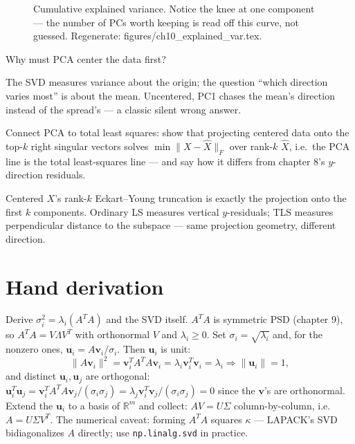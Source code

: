 \begin{figure}[htbp]
\centering

\caption{Cumulative explained variance. Notice the knee at one component
--- the number of PCs worth keeping is read off this curve, not guessed.
Regenerate: \ttfamily figures/ch10\_explained\_var.tex.}
\label{fig:explvar}
\end{figure}

\begin{exercise}[easy]
Why must PCA center the data first?
\begin{solution}
The SVD measures variance about the origin; the question ``which
direction varies most'' is about the mean. Uncentered, PC1 chases the
mean's direction instead of the spread's --- a classic silent wrong
answer.
\end{solution}
\end{exercise}

\begin{exercise}[hard]
Connect PCA to total least squares: show that projecting centered data
onto the top-$k$ right singular vectors solves $\min\lVert X-\hat
X\rVert_{F}$ over rank-$k$ $\hat X$, i.e.\ the PCA line is the total
least-squares line --- and say how it differs from chapter 8's
$y$-direction residuals.
\begin{solution}
Centered $X$'s rank-$k$ Eckart--Young truncation is exactly the
projection onto the first $k$ components. Ordinary LS measures vertical
$y$-residuals; TLS measures perpendicular distance to the subspace ---
same projection geometry, different direction.
\end{solution}
\end{exercise}

\section{Hand derivation}\label{sec:handderiv10}

Derive $\sigma_i^{2}=\lambda_i(A^{T}A)$ and the SVD itself. $A^{T}A$ is
symmetric PSD (chapter 9), so
$A^{T}A=V\Lambda V^{T}$ with orthonormal $V$ and $\lambda_i\ge0$.
Set $\sigma_i=\sqrt{\lambda_i}$ and, for the nonzero ones,
$\mathbf u_i=A\mathbf v_i/\sigma_i$. Then $\mathbf u_i$ is unit:
\[
\lVert A\mathbf v_i\rVert^{2}
=\mathbf v_i^{T}A^{T}A\mathbf v_i=\lambda_i\mathbf v_i^{T}\mathbf v_i
=\lambda_i\Rightarrow\lVert\mathbf u_i\rVert=1,
\]
and distinct $\mathbf u_i,\mathbf u_j$ are orthogonal:
$\mathbf u_i^{T}\mathbf u_j=\mathbf v_i^{T}A^{T}A\mathbf v_j/(\sigma_i\sigma_j)
=\lambda_j\mathbf v_i^{T}\mathbf v_j/(\sigma_i\sigma_j)=0$ since the
$\mathbf v$'s are orthonormal. Extend the $\mathbf u_i$ to a basis of
$\mathbb R^{m}$ and collect: $AV=U\Sigma$ column-by-column, i.e.\
$A=U\Sigma V^{T}$. The numerical caveat: forming $A^{T}A$ squares
$\kappa$ --- LAPACK's SVD bidiagonalizes $A$ directly; use
\texttt{np.linalg.svd} in practice.

